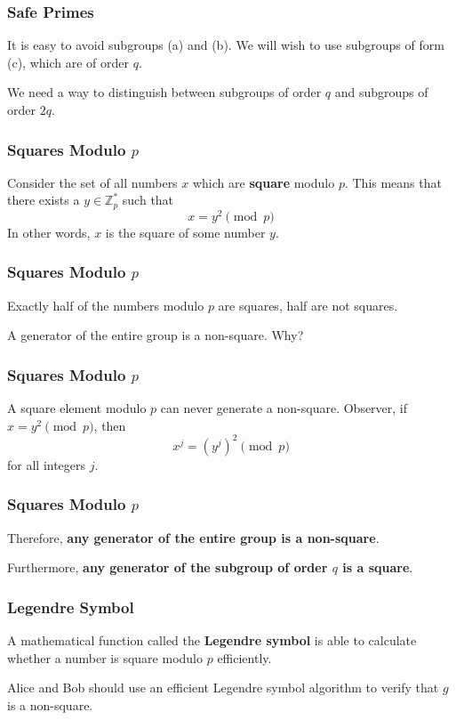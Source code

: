 \documentclass{beamer}
\newcommand{\<}{\langle}
\renewcommand{\>}{\rangle}
\newcommand{\Z}{\mathbb{Z}}
\begin{document}
\begin{frame}
\frametitle{Safe Primes}

It is easy to avoid subgroups (a) and (b). We will wish to use subgroups of form (c), which are of order $q$. \newline

We need a way to distinguish between subgroups of order $q$ and subgroups of order $2q$.
\end{frame}


\begin{frame}
\frametitle{Squares Modulo $p$}

Consider the set of all numbers $x$ which are \textbf{square} modulo $p$. This means that there exists a $y\in\Z_p^*$ such that 
\[
x = y^2 \pmod{p}
\]
In other words, $x$ is the square of some number $y$. 
\end{frame}


\begin{frame}
\frametitle{Squares Modulo $p$}

Exactly half of the numbers modulo $p$ are squares, half are not squares. \newline

A generator of the entire group is a non-square. Why?	
\end{frame}

\begin{frame}
\frametitle{Squares Modulo $p$}

A square element modulo $p$ can never generate a non-square. Observer, if $x=y^2\pmod p$, then
\[
x^j = (y^j)^2 \pmod p
\]
for all integers $j$. 
\end{frame}

\begin{frame}
\frametitle{Squares Modulo $p$}

Therefore, \textbf{any generator of the entire group is a non-square}.\newline

Furthermore, \textbf{any generator of the subgroup of order $q$ is a square}.
\end{frame}


\begin{frame}
\frametitle{Legendre Symbol}

A mathematical function called the \textbf{Legendre symbol} is able to calculate whether a number is square modulo $p$ efficiently. \newline

Alice and Bob should use an efficient Legendre symbol algorithm to verify that $g$ is a non-square. 
\end{frame}
\end{document}
